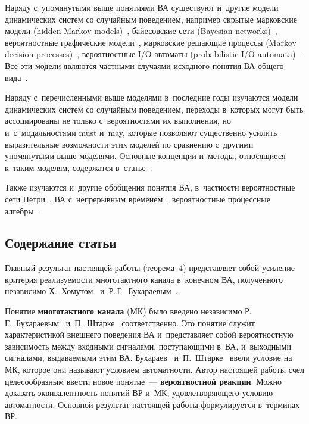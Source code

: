 \begin{multicols}{2}
Наряду с~упомянутыми выше понятиями ВА существуют и~другие модели
динамических сис\-тем со случайным поведением, например
скрытые марковские модели (hidden Markov models)~\cite{12-mir},
байесовские сети (Bayesian networks)~\cite{13-mir},
вероятностные графические модели~\cite{14-mir}, марковские решающие процессы
(Mar\-kov decision processes)~\cite{15-mir},
вероятностные I/O автоматы (pro\-ba\-bi\-li\-s\-tic    I/O automata)~\cite{16-mir}.
Все эти модели являются частными случаями
исходного понятия ВА общего вида~\cite{8-mir}.
{

}

Наряду с~перечисленными выше моделями в~последние годы изучаются модели
динамических сис\-тем со случайным поведением,
переходы в~которых могут быть ассоциированы
не только с~вероятностями их выполнения,
но и~с~модальностями must и~may, которые позволяют
существенно усилить выразительные возможности
этих моделей по сравнению с~другими упомянутыми выше моделями.
Основные концепции и~методы, относящиеся к~таким моделям,
содержатся в~статье~\cite{17-mir}.

Также изучаются и~другие обобщения понятия ВА, в~частности
вероятностные сети Петри~\cite{18-mir, 19-mir}, ВА  с~непрерывным временем~\cite{20-mir},
вероятностные процессные алгебры~\cite{21-mir}.


\subsection{Содержание статьи}

Главный результат настоящей работы (теорема~4)
представляет собой усиление критерия реализуемости многотактного
канала в~конечном ВА, полученного независимо 
Х.~Хо\-му\-том~\cite{23-mir} и~Р.\,Г.~Бухараевым~\cite{22-mir}.

Понятие \textbf{многотактного канала} (МК) было введено независимо
Р.\,Г.~Бухараевым~\cite{5-mir} и~П.~Штарке~\cite{6-mir}
соответственно. Это понятие служит характеристикой внешнего
поведения ВА  и~представляет собой вероятностную зависимость
между входными сигналами, поступающими в~ВА, и~выходными сигналами,
выдаваемыми этим ВА. Бухараев~\cite{5-mir} 
и~П.~Штарке~\cite{6-mir} ввели  условие на МК, которое они называют условием
автоматности. Автор настоящей работы счел целесообразным ввести
новое понятие~--- \textbf{вероятностной реакции}. Можно доказать
эквивалентность понятий ВР и~МК, удовлетворяющего
условию автоматности. Основной результат настоящей работы
формулируется в~терминах ВР.


\end{multicols}
